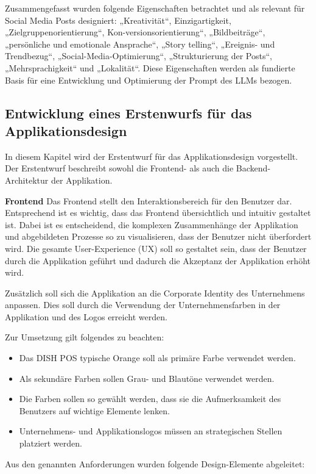 Zusammengefasst wurden folgende Eigenschaften betrachtet und als relevant für Social Media Posts designiert: „Kreativität“, Einzigartigkeit, „Zielgruppenorientierung“, Kon-versionsorientierung“, „Bildbeiträge“, „persönliche und emotionale Ansprache“, „Story telling“, „Ereignis- und Trendbezug“, „Social-Media-Optimierung“, „Strukturierung der Posts“, „Mehrsprachigkeit“ und „Lokalität“.
Diese Eigenschaften werden als fundierte Basis für eine Entwicklung und Optimierung der Prompt des LLMs bezogen.

\subsection{Entwicklung eines Erstenwurfs für das Applikationsdesign}\label{subsec:entwicklung-eines-erstenwurfs-fuer-das-applikationsdesign}
In diesem Kapitel wird der Erstentwurf für das Applikationsdesign vorgestellt.
Der Erstentwurf beschreibt sowohl die Frontend- als auch die Backend-Architektur der Applikation.

\textbf{Frontend}
Das Frontend stellt den Interaktionsbereich für den Benutzer dar.
Entsprechend ist es wichtig, dass das Frontend übersichtlich und intuitiv gestaltet ist.
Dabei ist es entscheidend, die komplexen Zusammenhänge der Applikation und abgebildeten Prozesse so zu visualisieren, dass der Benutzer nicht überfordert wird.
Die gesamte User-Experience (UX) soll so gestaltet sein, dass der Benutzer durch die Applikation geführt und dadurch die Akzeptanz der Applikation erhöht wird.

Zusätzlich soll sich die Applikation an die Corporate Identity des Unternehmens anpassen.
Dies soll durch die Verwendung der Unternehmensfarben in der Applikation und des Logos erreicht werden.

Zur Umsetzung gilt folgendes zu beachten:
\begin{itemize}
    \item Das DISH POS typische Orange soll als primäre Farbe verwendet werden.
    \item Als sekundäre Farben sollen Grau- und Blautöne verwendet werden.
    \item Die Farben sollen so gewählt werden, dass sie die Aufmerksamkeit des Benutzers auf wichtige Elemente lenken.
    \item Unternehmens- und Applikationslogos müssen an strategischen Stellen platziert werden.
\end{itemize}

Aus den genannten Anforderungen wurden folgende Design-Elemente abgeleitet:

